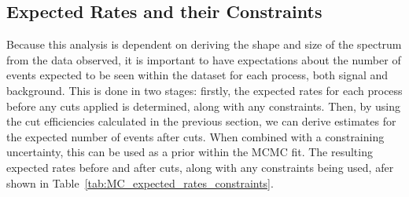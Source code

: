 \subsection{Expected Rates and their Constraints}\label{sec:exp_rates_constraints}
Because this analysis is dependent on deriving the shape and size of the \beight{} spectrum from the data observed, it is important to have expectations about the number of events expected to be seen within the dataset for each process, both signal and background. This is done in two stages: firstly, the expected rates for each process before any cuts applied is determined, along with any constraints. Then, by using the cut efficiencies calculated in the previous section, we can derive estimates for the expected number of events after cuts. When combined with a constraining uncertainty, this can be used as a prior within the MCMC fit. The resulting expected rates before and after cuts, along with any constraints being used, afer shown in Table~\ref{tab:MC_expected_rates_constraints}.

